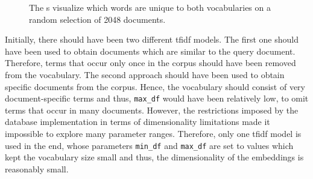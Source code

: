 \begin{figure}%
    \centering
    \qquad
    \caption[\wordcloud{}s for different \acs*{tfidf} preprocessors]{The \wordcloud{}s visualize which words are unique to both vocabularies 
    on a random selection of 2048 documents.}%
    \label{fig:differences-vocabularies}%
\end{figure}

Initially, there should have been two different \ac{tfidf} models.
The first one should have been used to obtain documents which are similar to the query document.
Therefore, terms that occur only once in the corpus should have been removed from the vocabulary.
The second approach should have been used to obtain specific documents from the corpus.
Hence, the vocabulary should consist of very document-specific terms and thus, \texttt{max\_df} would have been relatively low, to omit terms that occur in many documents.
However, the restrictions imposed by the database implementation in terms of dimensionality limitations
made it impossible to explore many parameter ranges.
Therefore, only one \ac{tfidf} model is used in the end, whose parameters \texttt{min\_df} and \texttt{max\_df} are set to values 
which kept the vocabulary size small and thus,
the dimensionality of the embeddings is reasonably small.